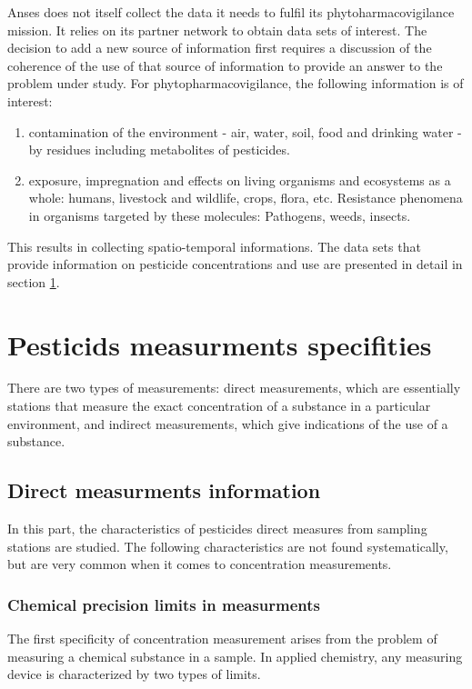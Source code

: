 Anses does not itself collect the data it needs to fulfil its phytoharmacovigilance mission. It relies on its partner network to obtain data sets of interest. The decision to add a new source of information first requires a discussion of the coherence of the use of that source of information to provide an answer to the problem under study. For phytopharmacovigilance, the following information is of interest: 
\begin{enumerate}
\item contamination of the environment - air, water, soil, food and drinking water - by residues including metabolites of pesticides.
\item exposure, impregnation and effects on living organisms and ecosystems as a whole: humans, livestock and wildlife, crops, flora, etc. Resistance phenomena in organisms targeted by these molecules: Pathogens, weeds, insects.
\end{enumerate}
This results in collecting spatio-temporal informations. The data sets that provide information on pesticide concentrations and use are presented in detail in section \ref{chp:2:3}.

\section{Pesticids measurments specifities}\label{chp:2:3}

There are two types of measurements: direct measurements, which are essentially stations that measure the exact concentration of a substance in a particular environment, and indirect measurements, which give indications of the use of a substance.

\subsection{Direct measurments information}

In this part, the characteristics of pesticides direct measures from sampling stations are studied. The following characteristics are not found systematically, but are very common when it comes to concentration measurements.

\subsubsection{Chemical precision limits in measurments}

The first specificity of concentration measurement arises from the problem of measuring a chemical substance in a sample. In applied chemistry, any measuring device is characterized by two types of limits. 

